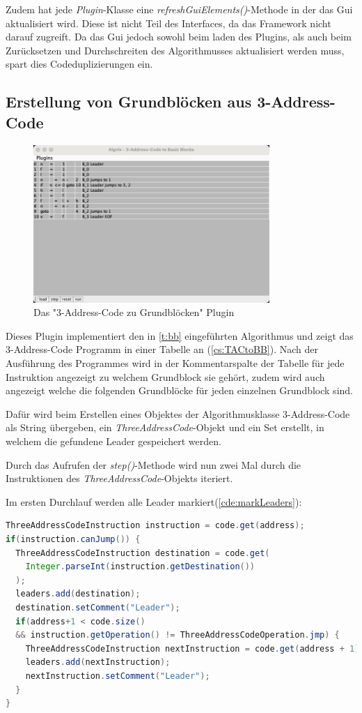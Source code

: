 Zudem hat jede \textit{Plugin}-Klasse eine \textit{refreshGuiElements()}-Methode
in der das Gui aktualisiert wird. Diese ist nicht Teil des Interfaces, da
das Framework nicht darauf zugreift. Da das Gui jedoch sowohl beim laden des Plugins, 
als auch beim Zurücksetzen und Durchschreiten des Algorithmusses aktualisiert werden muss,
spart dies Codeduplizierungen ein.






\subsection{Erstellung von Grundblöcken aus 3-Address-Code}
\begin{figure}[h]
  \centering
  \includegraphics[width=0.8\textwidth]{fig/Screenshot_TacToBb.png}
  \caption{Das "3-Address-Code zu Grundblöcken" Plugin}
  \label{sc:TACtoBB}
\end{figure}
Dieses Plugin implementiert den in \cref{t:bb} eingeführten Algorithmus
und zeigt das 3-Address-Code Programm in einer Tabelle an (\cref{cs:TACtoBB}). Nach der
Ausführung des Programmes wird in der Kommentarspalte der Tabelle für jede
Instruktion angezeigt zu welchem Grundblock sie gehört, zudem wird auch angezeigt
welche die folgenden Grundblöcke für jeden einzelnen Grundblock sind.

Dafür wird beim Erstellen eines Objektes der Algorithmusklasse 3-Address-Code
als String übergeben, ein \textit{ThreeAddressCode}-Objekt und ein Set erstellt, 
in welchem die gefundene Leader gespeichert werden.

Durch das Aufrufen der \textit{step()}-Methode wird nun zwei Mal durch die
Instruktionen des \textit{ThreeAddressCode}-Objekts iteriert.

\newpage
Im ersten Durchlauf werden alle Leader markiert(\cref{cde:markLeaders}):
\begin{lstlisting}[language=Java, caption={Markieren von Leadern}, label={cde:markLeaders}]
ThreeAddressCodeInstruction instruction = code.get(address);
if(instruction.canJump()) {
  ThreeAddressCodeInstruction destination = code.get(
    Integer.parseInt(instruction.getDestination())
  );
  leaders.add(destination);
  destination.setComment("Leader");
  if(address+1 < code.size() 
  && instruction.getOperation() != ThreeAddressCodeOperation.jmp) {
    ThreeAddressCodeInstruction nextInstruction = code.get(address + 1);
    leaders.add(nextInstruction);
    nextInstruction.setComment("Leader");
  }
}
\end{lstlisting}

